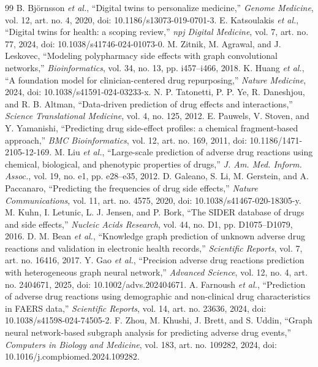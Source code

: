 \documentclass[conference,letterpaper]{IEEEtran}
\begin{document}
\begin{thebibliography}{99}
 B. Bj\"{o}rnsson \emph{et al.}, ``Digital twins to personalize medicine,'' \emph{Genome Medicine}, vol. 12, art. no. 4, 2020, doi: 10.1186/s13073-019-0701-3.
 E. Katsoulakis \emph{et al.}, ``Digital twins for health: a scoping review,'' \emph{npj Digital Medicine}, vol. 7, art. no. 77, 2024, doi: 10.1038/s41746-024-01073-0.
 M. Zitnik, M. Agrawal, and J. Leskovec, ``Modeling polypharmacy side effects with graph convolutional networks,'' \emph{Bioinformatics}, vol. 34, no. 13, pp. i457--i466, 2018.
 K. Huang \emph{et al.}, ``A foundation model for clinician-centered drug repurposing,'' \emph{Nature Medicine}, 2024, doi: 10.1038/s41591-024-03233-x.
 N. P. Tatonetti, P. P. Ye, R. Daneshjou, and R. B. Altman, ``Data-driven prediction of drug effects and interactions,'' \emph{Science Translational Medicine}, vol. 4, no. 125, 2012.
 E. Pauwels, V. Stoven, and Y. Yamanishi, ``Predicting drug side-effect profiles: a chemical fragment-based approach,'' \emph{BMC Bioinformatics}, vol. 12, art. no. 169, 2011, doi: 10.1186/1471-2105-12-169.
 M. Liu \emph{et al.}, ``Large-scale prediction of adverse drug reactions using chemical, biological, and phenotypic properties of drugs,'' \emph{J. Am. Med. Inform. Assoc.}, vol. 19, no. e1, pp. e28--e35, 2012.
 D. Galeano, S. Li, M. Gerstein, and A. Paccanaro, ``Predicting the frequencies of drug side effects,'' \emph{Nature Communications}, vol. 11, art. no. 4575, 2020, doi: 10.1038/s41467-020-18305-y.
 M. Kuhn, I. Letunic, L. J. Jensen, and P. Bork, ``The SIDER database of drugs and side effects,'' \emph{Nucleic Acids Research}, vol. 44, no. D1, pp. D1075--D1079, 2016.
 D. M. Bean \emph{et al.}, ``Knowledge graph prediction of unknown adverse drug reactions and validation in electronic health records,'' \emph{Scientific Reports}, vol. 7, art. no. 16416, 2017.
 Y. Gao \emph{et al.}, ``Precision adverse drug reactions prediction with heterogeneous graph neural network,'' \emph{Advanced Science}, vol. 12, no. 4, art. no. 2404671, 2025, doi: 10.1002/advs.202404671.
 A. Farnoush \emph{et al.}, ``Prediction of adverse drug reactions using demographic and non-clinical drug characteristics in FAERS data,'' \emph{Scientific Reports}, vol. 14, art. no. 23636, 2024, doi: 10.1038/s41598-024-74505-2.
 F. Zhou, M. Khushi, J. Brett, and S. Uddin, ``Graph neural network-based subgraph analysis for predicting adverse drug events,'' \emph{Computers in Biology and Medicine}, vol. 183, art. no. 109282, 2024, doi: 10.1016/j.compbiomed.2024.109282.

\end{thebibliography}
\end{document}
